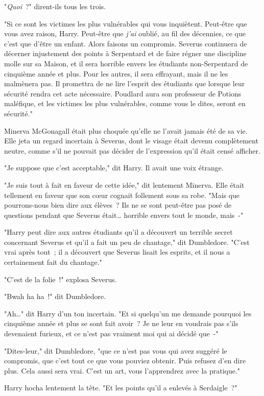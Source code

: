 "\emph{Quoi}~?" dirent-ils tous les trois.

"Si ce sont les victimes les plus vulnérables qui vous inquiètent. Peut-être que vous avez raison, Harry. Peut-être que \emph{j'ai} oublié, au fil des décennies, ce que c'est que d'être un enfant. Alors faisons un compromis. Severus continuera de décerner injustement des points à Serpentard et de faire régner une discipline molle sur sa Maison, et il sera horrible envers les étudiants non-Serpentard de cinquième année et plus. Pour les autres, il sera effrayant, mais il ne les malmènera pas. Il promettra de ne lire l'esprit des étudiants que lorsque leur sécurité rendra cet acte nécessaire. Poudlard aura son professeur de Potions maléfique, et les victimes les plus vulnérables, comme vous le dites, seront en sécurité."

Minerva McGonagall était plus choquée qu'elle ne l'avait jamais été de sa vie. Elle jeta un regard incertain à Severus, dont le visage était devenu complètement neutre, comme s'il ne pouvait pas décider de l'expression qu'il était censé afficher.

"Je suppose que c'est acceptable," dit Harry. Il avait une voix étrange.

"Je suis tout à fait en faveur de cette idée," dit lentement Minerva. Elle était tellement en faveur que son cœur cognait follement sous sa robe. "Mais que pourrons-nous bien dire aux élèves~? Ils ne se sont peut-être pas posé de questions pendant que Severus était… horrible envers tout le monde, mais~-"

"Harry peut dire aux autres étudiants qu'il a découvert un terrible secret concernant Severus et qu'il a fait un peu de chantage," dit Dumbledore. "C'est vrai après tout~; il a découvert que Severus lisait les esprits, et il nous a certainement fait du chantage."

"C'est de la folie~!" explosa Severus.

"Bwah ha ha~!" dit Dumbledore.

"Ah…" dit Harry d'un ton incertain. "Et si quelqu'un me demande pourquoi les cinquième année et plus se sont fait avoir~? Je ne leur en voudrais pas s'ils devenaient furieux, et ce n'est pas vraiment moi qui ai décidé que~-"

"Dites-leur," dit Dumbledore, "que ce n'est pas vous qui avez suggéré le compromis, que c'est tout ce que vous pouviez obtenir. Puis refusez d'en dire plus. Cela aussi sera vrai. C'est un art, vous l'apprendrez avec la pratique."

Harry hocha lentement la tête. "Et les points qu'il a enlevés à Serdaigle~?"

